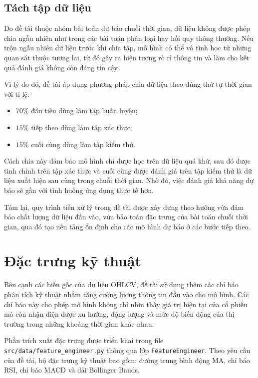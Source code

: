 \subsection{Tách tập dữ liệu}

Do đề tài thuộc nhóm bài toán dự báo chuỗi thời gian, dữ liệu không được phép chia ngẫu nhiên như trong các bài toán phân loại hay hồi quy thông thường. Nếu trộn ngẫu nhiên dữ liệu trước khi chia tập, mô hình có thể vô tình học từ những quan sát thuộc tương lai, từ đó gây ra hiện tượng rò rỉ thông tin và làm cho kết quả đánh giá không còn đáng tin cậy.

Vì lý do đó, đề tài áp dụng phương pháp chia dữ liệu theo đúng thứ tự thời gian với tỉ lệ:
\begin{itemize}
    \item $70\%$ đầu tiên dùng làm tập huấn luyện;
    \item $15\%$ tiếp theo dùng làm tập xác thực;
    \item $15\%$ cuối cùng dùng làm tập kiểm thử.
\end{itemize}

Cách chia này đảm bảo mô hình chỉ được học trên dữ liệu quá khứ, sau đó được tinh chỉnh trên tập xác thực và cuối cùng được đánh giá trên tập kiểm thử là dữ liệu xuất hiện sau cùng trong chuỗi thời gian. Nhờ đó, việc đánh giá khả năng dự báo sẽ gần với tình huống ứng dụng thực tế hơn.

Tóm lại, quy trình tiền xử lý trong đề tài được xây dựng theo hướng vừa đảm bảo chất lượng dữ liệu đầu vào, vừa bảo toàn đặc trưng của bài toán chuỗi thời gian, qua đó tạo nền tảng ổn định cho các mô hình dự báo ở các bước tiếp theo.

\section{Đặc trưng kỹ thuật}
\label{sec:dac_trung_ky_thuat}

Bên cạnh các biến gốc của dữ liệu OHLCV, đề tài sử dụng thêm các chỉ báo phân tích kỹ thuật nhằm tăng cường lượng thông tin đầu vào cho mô hình. Các chỉ báo này cho phép mô hình không chỉ nhìn thấy giá trị hiện tại của cổ phiếu mà còn nhận diện được xu hướng, động lượng và mức độ biến động của thị trường trong những khoảng thời gian khác nhau.

Phần trích xuất đặc trưng được triển khai trong file \texttt{src/data/feature\_engineer.py} thông qua lớp \texttt{FeatureEngineer}. Theo yêu cầu của đề tài, bộ đặc trưng kỹ thuật bao gồm: đường trung bình động MA, chỉ báo RSI, chỉ báo MACD và dải Bollinger Bands.

